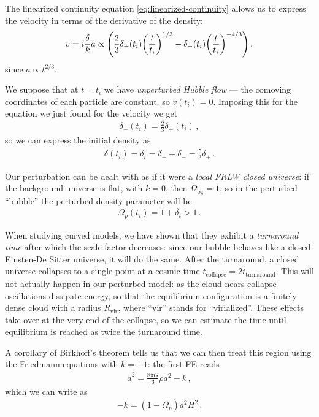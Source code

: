 \documentclass[main.tex]{subfiles}
\begin{document}
The linearized continuity equation \eqref{eq:linearized-continuity} allows us to express the velocity in terms of the derivative of the density: 
%
\begin{align}
v = i \frac{ \dot{\delta}}{k} a 
\propto \qty(\frac{2}{3} \delta_{+} (t_i) \qty(\frac{t}{t_i})^{1/3} - \delta_{-} (t_i) \qty(\frac{t}{t_i})^{-4/3})
\,,
\end{align}
%
since \(a \propto t^{2/3}\).

We suppose that at \(t=t_i\) we have \emph{unperturbed Hubble flow} --- the comoving coordinates of each particle are constant, so \(v(t_i) = 0\). Imposing this for the equation we just found for the velocity we get
%
\begin{align}
\delta_{-} (t_i) = \frac{2}{3} \delta_{+}(t_i)
\,,
\end{align}
%
so we can express the initial density as 
%
\begin{align}
\delta (t_i) = \delta_{i} = \delta_{+} + \delta_{-} = \frac{5}{3} \delta_{+} 
\,.
\end{align}

Our perturbation can be dealt with as if it were a \emph{local FRLW closed universe}: if the background universe is flat, with \(k=0\), then \(\Omega_{\text{bg}} = 1\), so in the perturbed ``bubble'' the perturbed  density parameter will be
%
\begin{align}
\Omega_p (t_i) = 1 + \delta_{i} > 1
\,.
\end{align}

When studying curved models, we have shown that they exhibit a \emph{turnaround time} after which the scale factor decreases: since our bubble behaves like a closed Einsten-De Sitter universe, it will do the same.
After the turnaround, a closed universe collapses to a single point at a cosmic time \(t_{\text{collapse}} = 2 t _{\text{turnaround}}\). 
This will not actually happen in our perturbed model: as the cloud nears collapse oscillations dissipate energy, so that the equilibrium configuration is a finitely-dense cloud with a radius \(R _{\text{vir}}\), where ``vir'' stands for ``virialized''.
These effects take over at the very end of the collapse, so we can estimate the time until equilibrium is reached as twice the turnaround time.

A corollary of Birkhoff's theorem tells us that we can then treat this region using the Friedmann equations with \(k = +1\): the first FE reads
%
\begin{align}
\dot{a}^2 = \frac{8 \pi G}{3} \rho a^2 - k 
\,,
\end{align}
%
which we can write as 
%
\begin{align}
- k = (1 - \Omega_p ) a^2 H^2
\,.
\end{align}
\end{document}
